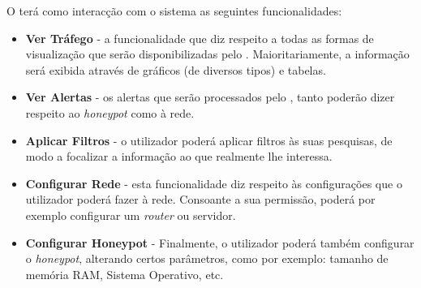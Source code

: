 O \uticomum terá como interacção com o sistema as seguintes funcionalidades:

\begin{itemize}
 \item \textbf{Ver Tráfego} - a funcionalidade que diz respeito a todas as formas de visualização que serão disponibilizadas pelo \visualz. Maioritariamente, a informação será exibida através de gráficos (de diversos tipos) e tabelas.
 \item \textbf{Ver Alertas} - os alertas que serão processados pelo \visualz, tanto poderão dizer respeito ao \emph{honeypot} como à rede.
 \item \textbf{Aplicar Filtros} - o utilizador poderá aplicar filtros às suas pesquisas, de modo a focalizar a informação ao que realmente lhe interessa.
 \item \textbf{Configurar Rede} - esta funcionalidade diz respeito às configurações que o utilizador poderá fazer à rede. Consoante a sua permissão, poderá por exemplo configurar um \emph{router} ou servidor.
 \item \textbf{Configurar Honeypot} - Finalmente, o utilizador poderá também configurar o \emph{honeypot}, alterando certos parâmetros, como por exemplo: tamanho de memória RAM, Sistema Operativo, etc.
\end{itemize}


